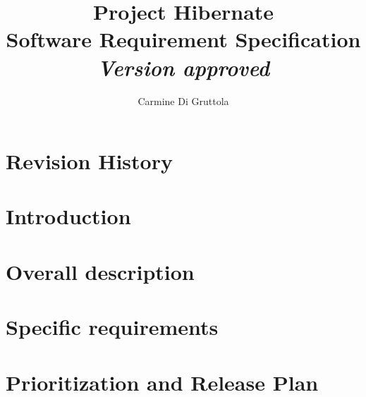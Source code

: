 \documentclass[a4paper]{report}
\title{{\huge Project Hibernate \\ Software Requirement Specification} \\  \textit{Version \myversion approved}}
\author{Carmine Di Gruttola}
\date{}
\begin{document}
    \maketitle
    
    \tableofcontents
    
    \chapter*{Revision History}
    
    
    \chapter{Introduction}
    
    
    \chapter{Overall description}
    
    
    \chapter{Specific requirements}
    
        
    \chapter{Prioritization and Release Plan}
    
    
    \begin{appendices}
        
    \end{appendices}
    
    
    
\end{document}
